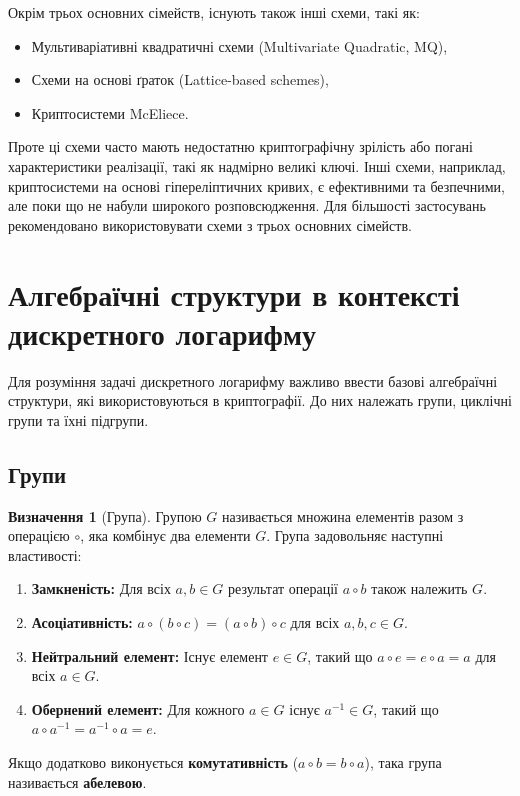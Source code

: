 \documentclass[12pt]{report}
\theoremstyle{definition}
\newtheorem{definition}{Визначення}[chapter]
\theoremstyle{plain}
\begin{document}
Окрім трьох основних сімейств, існують також інші схеми, такі як:
\begin{itemize}
    \item Мультиваріативні квадратичні схеми (Multivariate Quadratic, MQ),
    \item Схеми на основі ґраток (Lattice-based schemes),
    \item Криптосистеми McEliece.
\end{itemize}

Проте ці схеми часто мають недостатню криптографічну зрілість або погані характеристики реалізації, такі як надмірно великі ключі. Інші схеми, наприклад, криптосистеми на основі гіпереліптичних кривих, є ефективними та безпечними, але поки що не набули широкого розповсюдження. Для більшості застосувань рекомендовано використовувати схеми з трьох основних сімейств.

\section{Алгебраїчні структури в контексті дискретного логарифму}

Для розуміння задачі дискретного логарифму важливо ввести базові алгебраїчні структури, які використовуються в криптографії. До них належать групи, циклічні групи та їхні підгрупи.

\subsection{Групи}

\begin{definition}[Група]
Групою \( G \) називається множина елементів разом з операцією \( \circ \), яка комбінує два елементи \( G \). Група задовольняє наступні властивості:
\begin{enumerate}
    \item \textbf{Замкненість:} Для всіх \( a, b \in G \) результат операції \( a \circ b \) також належить \( G \).
    \item \textbf{Асоціативність:} \( a \circ (b \circ c) = (a \circ b) \circ c \) для всіх \( a, b, c \in G \).
    \item \textbf{Нейтральний елемент:} Існує елемент \( e \in G \), такий що \( a \circ e = e \circ a = a \) для всіх \( a \in G \).
    \item \textbf{Обернений елемент:} Для кожного \( a \in G \) існує \( a^{-1} \in G \), такий що \( a \circ a^{-1} = a^{-1} \circ a = e \).
\end{enumerate}
Якщо додатково виконується \textbf{комутативність} (\( a \circ b = b \circ a \)), така група називається \textbf{абелевою}.
\end{definition}
\end{document}
